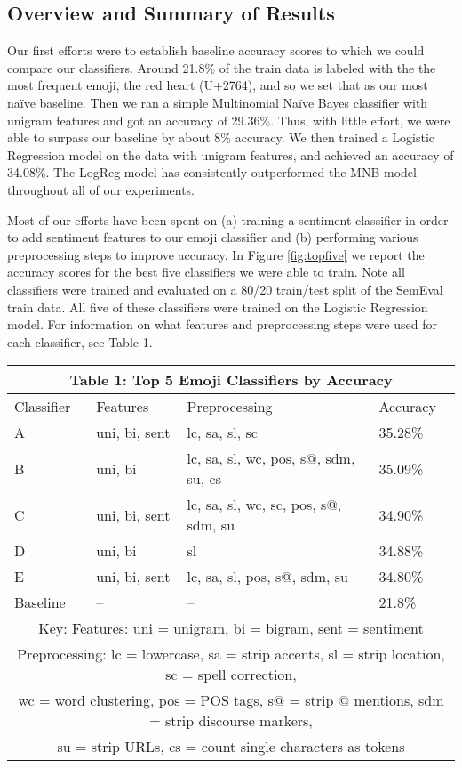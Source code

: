 \documentclass[10pt]{article}
\begin{document}
\subsection{Overview and Summary of Results}
Our first efforts were to establish baseline accuracy scores to which we could compare our classifiers. Around 21.8\% of the train data is labeled with the the most frequent emoji, the red heart (U+2764), and so we set that as our most naïve baseline. Then we ran a simple Multinomial Naïve Bayes classifier with unigram features and got an accuracy of 29.36\%. Thus, with little effort, we were able to surpass our baseline by about 8\% accuracy. We then trained a Logistic Regression model on the data with unigram features, and achieved an accuracy of 34.08\%. The LogReg model has consistently outperformed the MNB model throughout all of our experiments.

Most of our efforts have been spent on (a) training a sentiment classifier in order to add sentiment features to our emoji classifier and (b) performing various preprocessing steps to improve accuracy. In Figure \ref{fig:topfive} we report the accuracy scores for the best five classifiers we were able to train. Note all classifiers were trained and evaluated on a 80/20 train/test split of the SemEval train data. All five of these classifiers were trained on the Logistic Regression model. For information on what features and preprocessing steps were used for each classifier, see Table 1.
\begin{center}
\begin{tabular}{ |p{1.5cm}||p{3cm}|p{5.5cm}|p{1.5cm}|  }
 \hline
 \multicolumn{4}{|c|}{Table 1: Top 5 Emoji Classifiers by Accuracy} \\
 \hline
 Classifier & Features & Preprocessing & Accuracy\\
 \hline
 A & uni, bi, sent & lc, sa, sl, sc&   35.28\%\\
 B & uni, bi  & lc, sa, sl, wc, pos, s@, sdm, su, cs & 35.09\%\\
 C & uni, bi, sent & lc, sa, sl, wc, sc, pos, s@, sdm, su &  34.90\%\\
 D & uni, bi & sl &  34.88\%\\
 E & uni, bi, sent & lc, sa, sl, pos, s@, sdm, su & 34.80\%\\
 Baseline & -- & -- & 21.8\%\\
 \hline
 \multicolumn{4}{|c|}{Key: Features: uni = unigram, bi = bigram, sent = sentiment} \\
 \multicolumn{4}{|c|}{Preprocessing: lc = lowercase, sa = strip accents, sl = strip location, sc = spell correction,} \\
 \multicolumn{4}{|c|}{wc = word clustering, pos = POS tags, s@ = strip @ mentions, sdm = strip discourse markers,}\\
 \multicolumn{4}{|c|}{su = strip URLs, cs = count single characters as tokens}\\
 \hline
\end{tabular}
\end{center}
\end{document}
